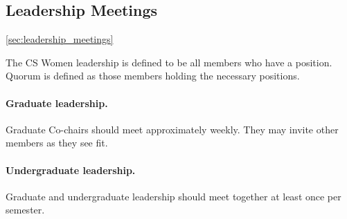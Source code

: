\subsection{Leadership Meetings}
\ref{sec:leadership_meetings}

The CS Women leadership is defined to be all members who have a position. Quorum is defined as those members holding the necessary positions. 

\paragraph{Graduate leadership.} Graduate Co-chairs should meet approximately weekly. They may invite other members as they see fit. 

\paragraph{Undergraduate leadership.} 


Graduate and undergraduate leadership should meet together at least once per semester.